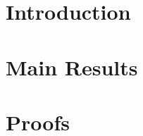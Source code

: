 \documentclass[bj,authoryear]{imsart}
\numberwithin{equation}{section}
\theoremstyle{plain}
\theoremstyle{definition}
\begin{document}
\section{Introduction}


\section{Main Results}



\section{Proofs}



 




%
%

%
\end{document}
